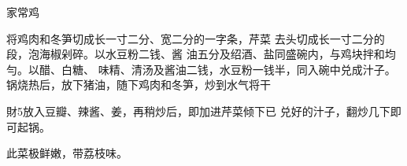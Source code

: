 \begin{recipe}{家常鸡}

\ingredients


\cooking

将鸡肉和冬笋切成长一寸二分、宽二分的一字条，芹菜 去头切成长一寸二分的段，泡海椒剁碎。以水豆粉二钱、酱 油五分及绍酒、盐同盛碗内，与鸡块拌和均勻。以醋、白糖、 味精、清汤及酱油二钱，水豆粉一钱半，同入碗中兑成汁子。 锅烧热后，放下猪油，随下鸡肉和冬笋，炒到水气将干

財5放入豆瓣、辣酱、姜，再稍炒后，即加进芹菜倾下已 兑好的汁子，翻炒几下即可起锅。

\notes

此菜极鲜嫩，带荔枝味。

\end{recipe}

